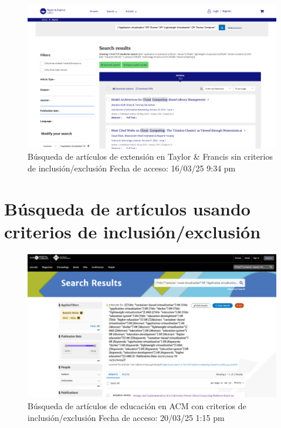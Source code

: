 \FloatBarrier\begin{figure}[H]
	\centering
	\includegraphics[width=\textwidth,keepaspectratio]{apendices/BD/sin-criterios/TF-ind.png}
	\caption{Búsqueda de artículos de extensión en Taylor \& Francis sin criterios de inclusión/exclusión
		Fecha de acceso: 16/03/25 9:34 pm
	}\label{fig:busqueda15}
\end{figure}
\FloatBarrier\section{Búsqueda de artículos usando criterios de inclusión/exclusión}
\begin{figure}[H]
	\centering
	\includegraphics[width=\textwidth,keepaspectratio]{apendices/BD/criterios/ACM-ed.png}
	\caption{Búsqueda de artículos de educación en ACM con criterios de inclusión/exclusión
		Fecha de acceso: 20/03/25 1:15 pm
	}\label{fig:busqueda16}
\end{figure}
